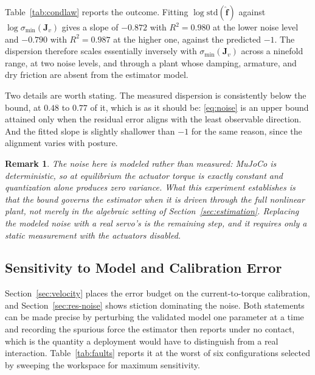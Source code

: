 \documentclass{ieeeaccess}
\newtheorem{remark}{Remark}
\newcommand{\Jv}{\bm{J}_{\!v}}
\begin{document}
Table~\ref{tab:condlaw} reports the outcome. Fitting
$\log\mathrm{std}(\hat{\bm f})$ against $\log\sigma_{\min}(\Jv)$ gives a slope of
$-0.872$ with $R^2=0.980$ at the lower noise level and $-0.790$ with $R^2=0.987$
at the higher one, against the predicted $-1$. The dispersion therefore scales
essentially inversely with $\sigma_{\min}(\Jv)$ across a ninefold range, at two
noise levels, and through a plant whose damping, armature, and dry friction are
absent from the estimator model.

Two details are worth stating. The measured dispersion is consistently below the
bound, at $0.48$ to $0.77$ of it, which is as it should be: \eqref{eq:noise} is an
upper bound attained only when the residual error aligns with the least
observable direction. And the fitted slope is slightly shallower than $-1$ for the
same reason, since the alignment varies with posture.

\begin{remark}
The noise here is modeled rather than measured: MuJoCo is deterministic, so at
equilibrium the actuator torque is exactly constant and quantization alone
produces zero variance. What this experiment establishes is that the bound governs
the estimator when it is driven through the full nonlinear plant, not merely in
the algebraic setting of Section~\ref{sec:estimation}. Replacing the modeled noise
with a real servo's is the remaining step, and it requires only a static
measurement with the actuators disabled.
\end{remark}

\subsection{Sensitivity to Model and Calibration Error}
\label{sec:res-sens}
Section~\ref{sec:velocity} places the error budget on the current-to-torque
calibration, and Section~\ref{sec:res-noise} shows stiction dominating the noise.
Both statements can be made precise by perturbing the validated model one
parameter at a time and recording the spurious force the estimator then reports
under no contact, which is the quantity a deployment would have to distinguish
from a real interaction. Table~\ref{tab:faults} reports it at the worst of six
configurations selected by sweeping the workspace for maximum sensitivity.
\end{document}
